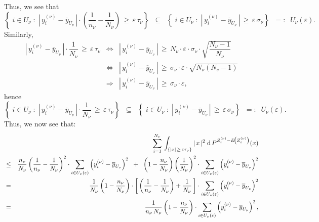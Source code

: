 Thus, we see that
\begin{equation*}
\left\{
\; i \in U_{\nu} \;:\;
\left\vert\,y^{(\nu)}_{i} - \overline{y}_{U_{\nu}}\,\right\vert
\cdot
\left(\frac{1}{n_{\nu}} - \frac{1}{N_{\nu}}\right)
\,\geq\,\varepsilon\,\tau_{\nu}
\right\}
\;\;\subseteq\;\;
\left\{
\; i \in U_{\nu} \;:\;
\left\vert\,y^{(\nu)}_{i} - \overline{y}_{U_{\nu}}\,\right\vert
\,\geq\,\varepsilon\,\sigma_{\nu}
\right\}
\;\;=:\;\; U_{\nu}(\varepsilon).
\end{equation*}
Similarly,
\begin{eqnarray*}
\left\vert\,y^{(\nu)}_{i} - \overline{y}_{U_{\nu}}\,\right\vert \cdot \dfrac{1}{N_{\nu}}
\,\geq\,\varepsilon\,\tau_{\nu}
&\Longleftrightarrow&
\left\vert\,y^{(\nu)}_{i} - \overline{y}_{U_{\nu}}\,\right\vert
\,\geq\,
N_{\nu} \cdot \varepsilon \cdot \sigma_{\nu} \cdot
\sqrt{\dfrac{N_{\nu}-1}{N_{\nu}}}
\\
&\Longleftrightarrow&
\left\vert\,y^{(\nu)}_{i} - \overline{y}_{U_{\nu}}\,\right\vert
\,\geq\,
\sigma_{\nu} \cdot \varepsilon \cdot \sqrt{N_{\nu}(N_{\nu}-1)}
\\
&\Longrightarrow&
\left\vert\,y^{(\nu)}_{i} - \overline{y}_{U_{\nu}}\,\right\vert
\,\geq\,
\sigma_{\nu} \cdot \varepsilon,
\end{eqnarray*}
hence
\begin{equation*}
\left\{
\; i \in U_{\nu} \;:\;
\left\vert\,y^{(\nu)}_{i} - \overline{y}_{U_{\nu}}\,\right\vert
\cdot
\dfrac{1}{N_{\nu}}
\,\geq\,\varepsilon\,\tau_{\nu}
\right\}
\;\;\subseteq\;\;
\left\{
\; i \in U_{\nu} \;:\;
\left\vert\,y^{(\nu)}_{i} - \overline{y}_{U_{\nu}}\,\right\vert
\,\geq\,\varepsilon\,\sigma_{\nu}
\right\}
\;\;=:\;\; U_{\nu}(\varepsilon).
\end{equation*}
Thus, we now see that:
\begin{eqnarray*}
&&
\sum_{i=1}^{N_{\nu}}\,
\int_{\left\{\vert x\vert \,\geq\, \varepsilon\tau_{\nu}\right\}}
\vert\,x\,\vert^{2}\;
\textnormal{d}\,P^{Z^{(\nu)}_{i} - E\!\left(Z^{(\nu)}_{i}\right)}(x)
\\
&\leq&
\dfrac{n_{\nu}}{N_{\nu}}\left(\dfrac{1}{n_{\nu}}-\dfrac{1}{N_{\nu}}\right)^{2}
\cdot\sum_{i\in U_{\nu}(\varepsilon)}\left(y^{(\nu)}_{i}-\overline{y}_{U_{\nu}}\right)^{2}
\;\; + \;\;
\left(1-\dfrac{n_{\nu}}{N_{\nu}}\right)
\left(\dfrac{1}{N_{\nu}}\right)^{2}
\cdot\sum_{i\in U_{\nu}(\varepsilon)}\left(y^{(\nu)}_{i}-\overline{y}_{U_{\nu}}\right)^{2}
\\
&=&
\dfrac{1}{N_{\nu}}
\left(1- \dfrac{n_{\nu}}{N_{\nu}}\right)
\cdot
\left[\,\left(\dfrac{1}{n_{\nu}} - \dfrac{1}{N_{\nu}}\right) + \dfrac{1}{N_{\nu}}\,\right]
\cdot\sum_{i\in U_{\nu}(\varepsilon)}\left(y^{(\nu)}_{i}-\overline{y}_{U_{\nu}}\right)^{2}
\\
&=&
\dfrac{1}{n_{\nu}\,N_{\nu}}
\left(1- \dfrac{n_{\nu}}{N_{\nu}}\right)
\cdot\sum_{i\in U_{\nu}(\varepsilon)}\left(y^{(\nu)}_{i}-\overline{y}_{U_{\nu}}\right)^{2},
\end{eqnarray*}
